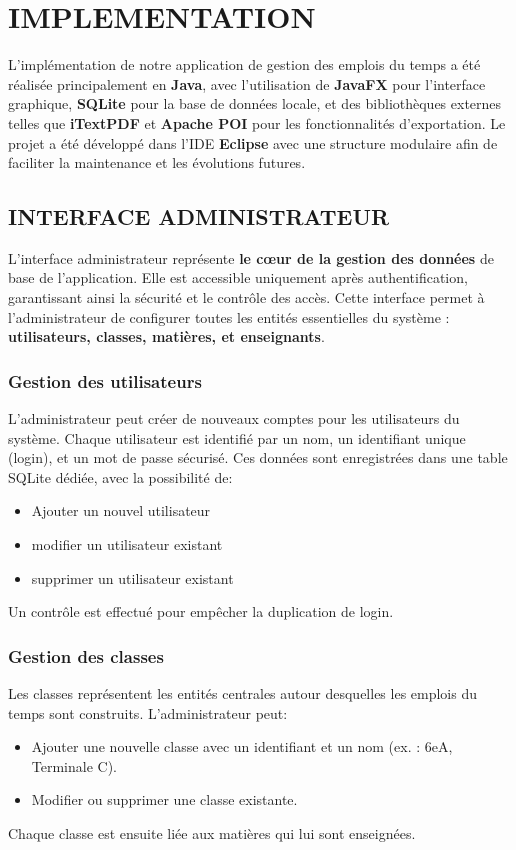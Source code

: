 \documentclass[english,12pt,a4paper]{report}
\begin{document}
 \chapter{IMPLEMENTATION}
L’implémentation de notre application de gestion des emplois du temps a été réalisée principalement en \textbf{Java}, avec l’utilisation de \textbf{JavaFX} pour l’interface graphique, \textbf{SQLite} pour la base de données locale, et des bibliothèques externes telles que \textbf{iTextPDF} et \textbf{Apache POI} pour les fonctionnalités d’exportation. Le projet a été développé dans l’IDE \textbf{Eclipse} avec une structure modulaire afin de faciliter la maintenance et les évolutions futures.


 \section{INTERFACE ADMINISTRATEUR}
 L’interface administrateur représente \textbf{le cœur de la gestion des données} de base de l’application. Elle est accessible uniquement après authentification, garantissant ainsi la sécurité et le contrôle des accès. Cette interface permet à l'administrateur de configurer toutes les entités essentielles du système : \textbf{utilisateurs, classes, matières, et enseignants}.
 
 \subsection{Gestion des utilisateurs}
 L'administrateur peut créer de nouveaux comptes pour les utilisateurs du système. Chaque utilisateur est identifié par un nom, un identifiant unique (login), et un mot de passe sécurisé. Ces données sont enregistrées dans une table SQLite dédiée, avec la possibilité de: 
 \begin{itemize}
 	\item Ajouter un nouvel utilisateur
 	\item modifier un utilisateur existant
 	\item supprimer un utilisateur existant
 \end{itemize}
 Un contrôle est effectué pour empêcher la duplication de login.
 \subsection{Gestion des classes}
 Les classes représentent les entités centrales autour desquelles les emplois du temps sont construits. L’administrateur peut:
 \begin{itemize}
 	\item Ajouter une nouvelle classe avec un identifiant et un nom (ex. : 6eA, Terminale C).
 	\item Modifier ou supprimer une classe existante.
 \end{itemize}
 Chaque classe est ensuite liée aux matières qui lui sont enseignées.
\end{document}
